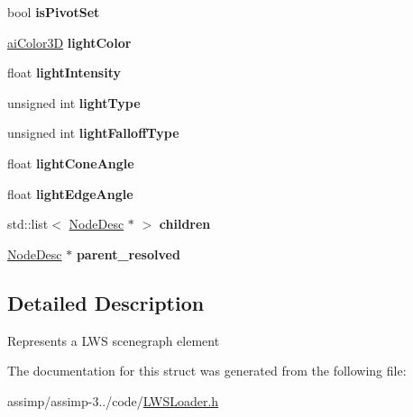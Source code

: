 \begin{DoxyCompactItemize}
\item 
\hypertarget{struct_assimp_1_1_l_w_s_1_1_node_desc_a1ff96dd40d30e809fa8e565c8f74ccc1}{bool {\bfseries is\+Pivot\+Set}}\label{struct_assimp_1_1_l_w_s_1_1_node_desc_a1ff96dd40d30e809fa8e565c8f74ccc1}

\item 
\hypertarget{struct_assimp_1_1_l_w_s_1_1_node_desc_aa8e4503c0bc537c7e7e478faffccd8be}{\hyperlink{structai_color3_d}{ai\+Color3\+D} {\bfseries light\+Color}}\label{struct_assimp_1_1_l_w_s_1_1_node_desc_aa8e4503c0bc537c7e7e478faffccd8be}

\item 
\hypertarget{struct_assimp_1_1_l_w_s_1_1_node_desc_accbf7e94ab9ec73691828b069714d82d}{float {\bfseries light\+Intensity}}\label{struct_assimp_1_1_l_w_s_1_1_node_desc_accbf7e94ab9ec73691828b069714d82d}

\item 
\hypertarget{struct_assimp_1_1_l_w_s_1_1_node_desc_ae81e8b9f6f8233a3b00e545ad8e75a75}{unsigned int {\bfseries light\+Type}}\label{struct_assimp_1_1_l_w_s_1_1_node_desc_ae81e8b9f6f8233a3b00e545ad8e75a75}

\item 
\hypertarget{struct_assimp_1_1_l_w_s_1_1_node_desc_aedae03f2ba681126d86dfb464dc5fd7c}{unsigned int {\bfseries light\+Falloff\+Type}}\label{struct_assimp_1_1_l_w_s_1_1_node_desc_aedae03f2ba681126d86dfb464dc5fd7c}

\item 
\hypertarget{struct_assimp_1_1_l_w_s_1_1_node_desc_a4e6b95c18551a331acc2bc107651afdc}{float {\bfseries light\+Cone\+Angle}}\label{struct_assimp_1_1_l_w_s_1_1_node_desc_a4e6b95c18551a331acc2bc107651afdc}

\item 
\hypertarget{struct_assimp_1_1_l_w_s_1_1_node_desc_a544613c393fd98379343aa31271a4ba1}{float {\bfseries light\+Edge\+Angle}}\label{struct_assimp_1_1_l_w_s_1_1_node_desc_a544613c393fd98379343aa31271a4ba1}

\item 
\hypertarget{struct_assimp_1_1_l_w_s_1_1_node_desc_a22088fe37d6f4a2d9d0fe191b84f1cdc}{std\+::list$<$ \hyperlink{struct_assimp_1_1_l_w_s_1_1_node_desc}{Node\+Desc} $\ast$ $>$ {\bfseries children}}\label{struct_assimp_1_1_l_w_s_1_1_node_desc_a22088fe37d6f4a2d9d0fe191b84f1cdc}

\item 
\hypertarget{struct_assimp_1_1_l_w_s_1_1_node_desc_a4487fbd63519d6749bde274abb7e92e9}{\hyperlink{struct_assimp_1_1_l_w_s_1_1_node_desc}{Node\+Desc} $\ast$ {\bfseries parent\+\_\+resolved}}\label{struct_assimp_1_1_l_w_s_1_1_node_desc_a4487fbd63519d6749bde274abb7e92e9}

\end{DoxyCompactItemize}


\subsection{Detailed Description}
Represents a L\+W\+S scenegraph element 

The documentation for this struct was generated from the following file\+:\begin{DoxyCompactItemize}
\item 
assimp/assimp-\/3../code/\hyperlink{_l_w_s_loader_8h}{L\+W\+S\+Loader.\+h}\end{DoxyCompactItemize}
